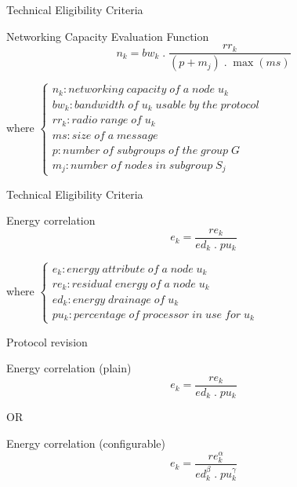 \documentclass{beamer}
\begin{document}
\begin{frame}{Technical Eligibility Criteria}
	\begin{block}{Networking Capacity Evaluation Function}
		\begin{equation*}
			n_k = bw_k \; .\; \frac{rr_k}{\left( p + m_j \right) \; .\; \max\left( ms \right)}
		\end{equation*}
	\end{block}
	\vfill
	where
	\begin{math}
		\left\{
		\begin{array}{l}
			n_k: networking\; capacity\; of\; a\; node\; u_k\\
			bw_k: bandwidth\; of\; u_k\; usable\; by\; the\; protocol\\
			rr_k: radio\; range\; of\; u_k\\
			ms: size\; of\; a\; message\\
			p: number\; of\; subgroups\; of\; the\; group\; G\\
			m_j: number\; of\; nodes\; in\; subgroup\; S_j
		\end{array}
		\right.
	\end{math}
\end{frame}

\begin{frame}{Technical Eligibility Criteria}
	\begin{block}{Energy correlation}
		\begin{equation*}
			e_k = \frac{re_k}{ed_k \; .\; pu_k}
		\end{equation*}
	\end{block}
	\vfill
	where
	\begin{math}
		\left\{
		\begin{array}{l}
			e_k: energy\; attribute\; of\; a\; node\; u_k\\
			re_k: residual\; energy\; of\; a\; node\; u_k\\
			ed_k: energy\; drainage\; of\; u_k\\
			pu_k: percentage\; of\; processor\; in\; use\; for\; u_k
		\end{array}
		\right.
	\end{math}
\end{frame}

\begin{frame}{Protocol revision}
	\begin{block}{Energy correlation (plain)}
		\begin{equation*}
			e_k = \frac{re_k}{ed_k \; .\; pu_k}
		\end{equation*}
	\end{block}
	\vfill
	\centering
	OR
	\vfill
	\begin{block}{Energy correlation (configurable)}
		\begin{equation*}
			e_k = \frac{re_k^{\alpha}}{ed_k^{\beta} \; .\; pu_k^{\gamma}}
		\end{equation*}
	\end{block}
\end{frame}

\end{document}
